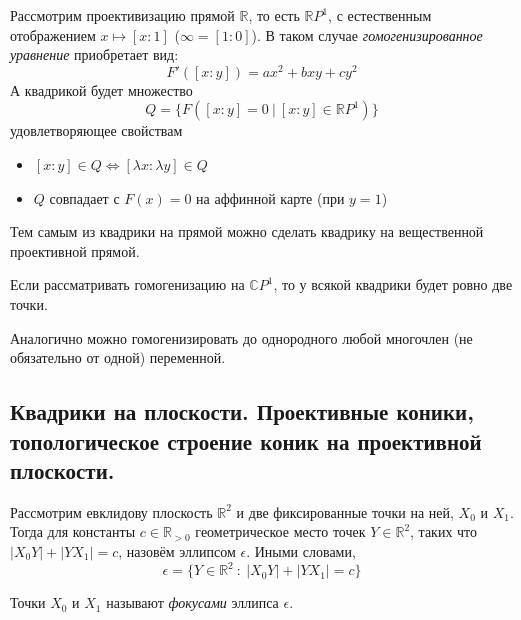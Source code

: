 \documentclass[11pt]{report}
\begin{document}
    Рассмотрим проективизацию прямой $\mathbb{R}$, то есть $ \mathbb{R}P^1$, с естественным отображением $x \mapsto [x:1]$ ($\infty = [1:0]$). В таком случае \emph{гомогенизированное уравнение} приобретает вид:
    \begin{equation*}
        F'([x:y]) = ax^2 + bxy + cy^2
    \end{equation*}
    А квадрикой будет множество
    \begin{equation*}
        Q = \{F([x : y] = 0 \ |\ [x:y] \in \mathbb{R}P^1)\}
    \end{equation*}
    удовлетворяющее свойствам
    \begin{itemize}
        \item $[x:y] \in Q \Longleftrightarrow [\lambda x:\lambda y] \in Q$
        \item $Q$ совпадает с $F(x) = 0$ на аффинной карте (при $y = 1$)
    \end{itemize}
    Тем самым из квадрики на прямой можно сделать квадрику на вещественной проективной прямой.

    \begin{remark}
    Если рассматривать гомогенизацию на $\mathbb{C}P^1$, то у всякой квадрики будет ровно две точки.
    \end{remark}

    \begin{remark}
    Аналогично можно гомогенизировать до однородного любой многочлен (не обязательно от одной) переменной.
    \end{remark}

    \subsection{Квадрики на плоскости. Проективные коники, топологическое строение коник на проективной плоскости. }

    \begin{definition}
    Рассмотрим евклидову плоскость $\mathbb{R}^2$ и две фиксированные точки на ней, $X_0$ и $X_1$. Тогда для константы $c \in \mathbb{R}_{>0}$ геометрическое место точек $Y \in \mathbb{R}^2$, таких что $|X_0Y| + |YX_1| = c$, назовём эллипсом $\epsilon$. Иными словами,
    \begin{equation*}
        \epsilon = \{Y \in \mathbb{R}^2 \ :\ |X_0Y| + |YX_1| = c\}
    \end{equation*}
    \end{definition}

    \begin{remark}
    Точки $X_0$ и $X_1$ называют \emph{фокусами} эллипса $\epsilon$.
    \end{remark}
\end{document}
